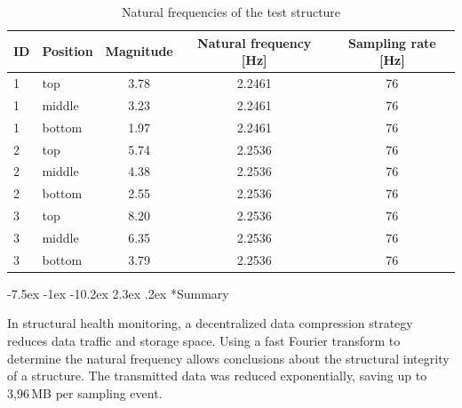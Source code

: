 \documentclass[12pt,a4paper]{scrartcl}
\makeatletter
\renewcommand\section{\@startsection{section}{1}{\z@}%
                     {-7.5ex \@plus -1ex \@minus -10.2ex}%
                     {2.3ex \@plus.2ex}%
                     {\sffamily\large\bfseries}}
\makeatother
\begin{document}
\begin{table}[hb]
	\centering
	\begin{tabular}{l l c c c}
		\toprule
		ID & Position & Magnitude & Natural frequency [Hz] & Sampling rate [Hz]\\ 
		\midrule
		1 & top & 3.78 & 2.2461 & 76\\ 
		1 & middle & 3.23 & 2.2461 & 76\\ 
		1 & bottom & 1.97 & 2.2461 & 76\\ 
		\midrule	
		2 & top & 5.74 & 2.2536 & 76\\  
		2 & middle & 4.38 & 2.2536 & 76\\ 
		2 & bottom & 2.55 & 2.2536 & 76\\
		\midrule
		3 & top & 8.20 & 2.2536 & 76\\
		3 & middle & 6.35 & 2.2536 & 76\\ 
		3 & bottom & 3.79 & 2.2536 & 76\\
		\bottomrule
	\end{tabular}
	\caption{Natural frequencies of the test structure}
	\label{tab:lab-ex}
\end{table}


\section*{Summary}

In structural health monitoring, a decentralized data compression strategy reduces data traffic and storage space.
Using a fast Fourier transform to determine the natural frequency allows conclusions about the structural integrity of a structure.
The transmitted data was reduced exponentially, saving up to 3,96\,MB per sampling event.




\end{document}
